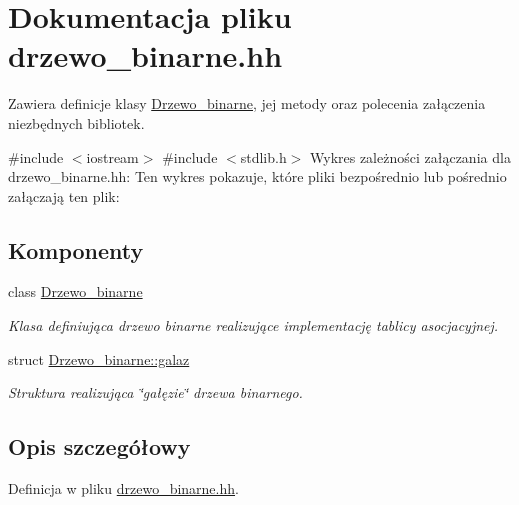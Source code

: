 \hypertarget{drzewo__binarne_8hh}{\section{\-Dokumentacja pliku drzewo\-\_\-binarne.\-hh}
\label{drzewo__binarne_8hh}
}


\-Zawiera definicje klasy \hyperlink{class_drzewo__binarne}{\-Drzewo\-\_\-binarne}, jej metody oraz polecenia załączenia niezbędnych bibliotek.  


{\ttfamily \#include $<$iostream$>$}\*
{\ttfamily \#include $<$stdlib.\-h$>$}\*
\-Wykres zależności załączania dla drzewo\-\_\-binarne.\-hh\-:
\-Ten wykres pokazuje, które pliki bezpośrednio lub pośrednio załączają ten plik\-:
\subsection*{\-Komponenty}
\begin{DoxyCompactItemize}
\item 
class \hyperlink{class_drzewo__binarne}{\-Drzewo\-\_\-binarne}
\begin{DoxyCompactList}\small\item\em \-Klasa definiująca drzewo binarne realizujące implementację tablicy asocjacyjnej. \end{DoxyCompactList}\item 
struct \hyperlink{struct_drzewo__binarne_1_1galaz}{\-Drzewo\-\_\-binarne\-::galaz}
\begin{DoxyCompactList}\small\item\em \-Struktura realizująca \char`\"{}gałęzie\char`\"{} drzewa binarnego. \end{DoxyCompactList}\end{DoxyCompactItemize}


\subsection{\-Opis szczegółowy}


\-Definicja w pliku \hyperlink{drzewo__binarne_8hh_source}{drzewo\-\_\-binarne.\-hh}.

